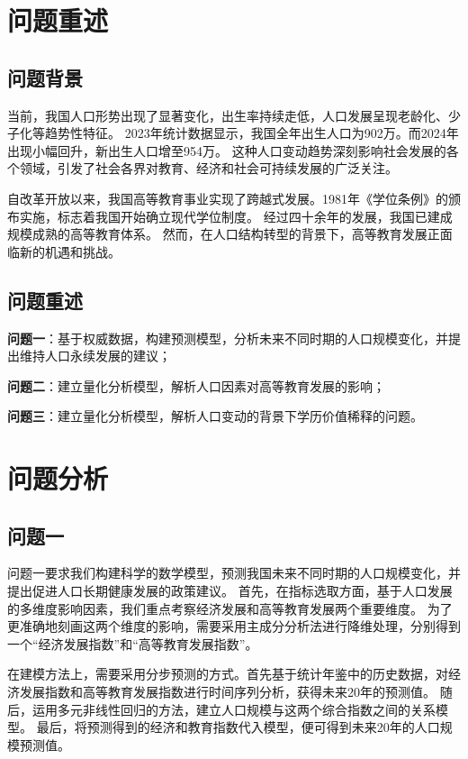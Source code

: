 \documentclass[withoutpreface,bwprint]{cumcmthesis} %
\newcommand{\upcite}[1]{\textsuperscript{\textsuperscript{\cite{#1}}}}
\begin{document}


\section{问题重述}

\subsection{问题背景}

当前，我国人口形势出现了显著变化，出生率持续走低，人口发展呈现老龄化、少子化等趋势性特征。
2023年统计数据显示，我国全年出生人口为902万。而2024年出现小幅回升，新出生人口增至954万。
这种人口变动趋势深刻影响社会发展的各个领域，引发了社会各界对教育、经济和社会可持续发展的广泛关注。

自改革开放以来，我国高等教育事业实现了跨越式发展。1981年《学位条例》\upcite{学位条例}的颁布实施，标志着我国开始确立现代学位制度。
经过四十余年的发展，我国已建成规模成熟的高等教育体系。
然而，在人口结构转型的背景下，高等教育发展正面临新的机遇和挑战。

\subsection{问题重述}

\textbf{问题一}：基于权威数据，构建预测模型，分析未来不同时期的人口规模变化，并提出维持人口永续发展的建议；

\textbf{问题二}：建立量化分析模型，解析人口因素对高等教育发展的影响；

\textbf{问题三}：建立量化分析模型，解析人口变动的背景下学历价值稀释的问题。


\section{问题分析}

\subsection{问题一}

问题一要求我们构建科学的数学模型，预测我国未来不同时期的人口规模变化，并提出促进人口长期健康发展的政策建议。
首先，在指标选取方面，基于人口发展的多维度影响因素，我们重点考察经济发展和高等教育发展两个重要维度。
为了更准确地刻画这两个维度的影响，需要采用主成分分析法进行降维处理，分别得到一个“经济发展指数”和“高等教育发展指数”。

在建模方法上，需要采用分步预测的方式。首先基于统计年鉴中的历史数据，对经济发展指数和高等教育发展指数进行时间序列分析，获得未来20年的预测值。
随后，运用多元非线性回归的方法，建立人口规模与这两个综合指数之间的关系模型。
最后，将预测得到的经济和教育指数代入模型，便可得到未来20年的人口规模预测值。
\end{document}
